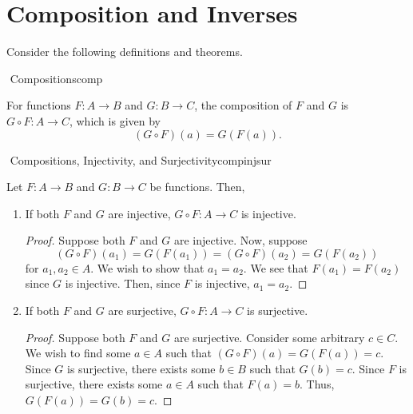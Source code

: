 \pagebreak

\section{Composition and Inverses}

    Consider the following definitions and theorems.
    \begin{definition}{\Stop\,\,Compositions}{comp}

        For functions \(F:A\to B\) and \(G:B\to C\), the composition of \(F\) and \(G\) is \(G\circ F:A\to C\), which is given by
        \begin{equation*}
            (G\circ F)(a)=G(F(a)).
        \end{equation*}
        
    \end{definition}
    \begin{theorem}{\Stop\,\,Compositions, Injectivity, and Surjectivity}{compinjsur}

        Let \(F:A\to B\) and \(G:B\to C\) be functions. Then,
        \begin{enumerate}
            \item If both \(F\) and \(G\) are injective, \(G\circ F:A\to C\) is injective.
            \begin{proof}
                Suppose both \(F\) and \(G\) are injective. Now, suppose 
                \begin{equation*}
                    (G\circ F)(a_1)=G(F(a_1))=(G\circ F)(a_2)=G(F(a_2))
                \end{equation*}
                 for \(a_1,a_2\in A\). We wish to show that \(a_1=a_2\). We see that \(F(a_1)=F(a_2)\) since \(G\) is injective. Then, since \(F\) is injective, \(a_1=a_2\).
            \end{proof}
            \item If both \(F\) and \(G\) are surjective, \(G\circ F:A\to C\) is surjective.
            \begin{proof}
                Suppose both \(F\) and \(G\) are surjective. Consider some arbitrary \(c\in C\). We wish to find some \(a\in A\) such that \((G\circ F)(a)=G(F(a))=c\). Since \(G\) is surjective, there exists some \(b\in B\) such that \(G(b)=c\). Since \(F\) is surjective, there exists some \(a\in A\) such that \(F(a)=b\). Thus, \(G(F(a))=G(b)=c\).
            \end{proof}
        \end{enumerate}
        
    \end{theorem}

